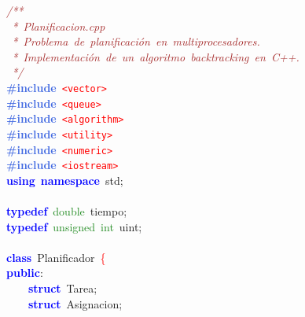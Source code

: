 \noindent
\mbox{}\textit{\textcolor{Brown}{/**}} \\
\mbox{}\textit{\textcolor{Brown}{\ *\ Planificacion.cpp}} \\
\mbox{}\textit{\textcolor{Brown}{\ *\ Problema\ de\ planificación\ en\ multiprocesadores.}} \\
\mbox{}\textit{\textcolor{Brown}{\ *\ Implementación\ de\ un\ algoritmo\ backtracking\ en\ C++.}} \\
\mbox{}\textit{\textcolor{Brown}{\ */}} \\
\mbox{}\textbf{\textcolor{RoyalBlue}{\#include}}\ \texttt{\textcolor{Red}{\textless{}vector\textgreater{}}} \\
\mbox{}\textbf{\textcolor{RoyalBlue}{\#include}}\ \texttt{\textcolor{Red}{\textless{}queue\textgreater{}}} \\
\mbox{}\textbf{\textcolor{RoyalBlue}{\#include}}\ \texttt{\textcolor{Red}{\textless{}algorithm\textgreater{}}} \\
\mbox{}\textbf{\textcolor{RoyalBlue}{\#include}}\ \texttt{\textcolor{Red}{\textless{}utility\textgreater{}}} \\
\mbox{}\textbf{\textcolor{RoyalBlue}{\#include}}\ \texttt{\textcolor{Red}{\textless{}numeric\textgreater{}}} \\
\mbox{}\textbf{\textcolor{RoyalBlue}{\#include}}\ \texttt{\textcolor{Red}{\textless{}iostream\textgreater{}}} \\
\mbox{}\textbf{\textcolor{Blue}{using}}\ \textbf{\textcolor{Blue}{namespace}}\ std\textcolor{BrickRed}{;} \\
\mbox{} \\
\mbox{}\textbf{\textcolor{Blue}{typedef}}\ \textcolor{ForestGreen}{double}\ tiempo\textcolor{BrickRed}{;} \\
\mbox{}\textbf{\textcolor{Blue}{typedef}}\ \textcolor{ForestGreen}{unsigned}\ \textcolor{ForestGreen}{int}\ uint\textcolor{BrickRed}{;} \\
\mbox{} \\
\mbox{}\textbf{\textcolor{Blue}{class}}\ \textcolor{TealBlue}{Planificador}\ \textcolor{Red}{\{} \\
\mbox{}\textbf{\textcolor{Blue}{public}}\textcolor{BrickRed}{:} \\
\mbox{}\ \ \ \ \textbf{\textcolor{Blue}{struct}}\ \textcolor{TealBlue}{Tarea}\textcolor{BrickRed}{;} \\
\mbox{}\ \ \ \ \textbf{\textcolor{Blue}{struct}}\ \textcolor{TealBlue}{Asignacion}\textcolor{BrickRed}{;} \\
